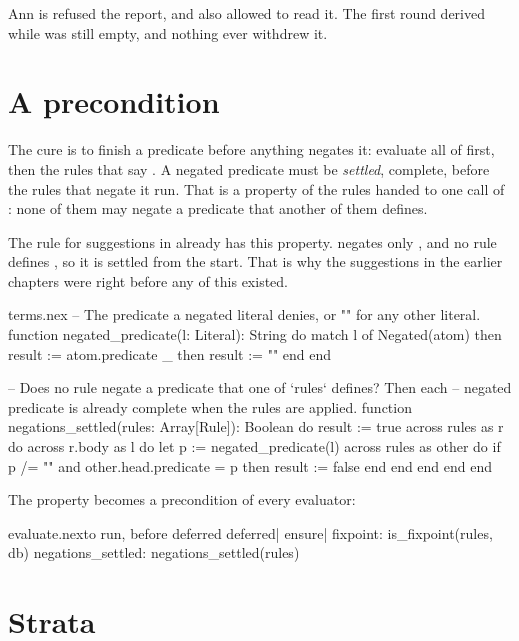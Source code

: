 Ann is refused the report, and also allowed to read it. The first round
derived  while  was still empty,
and nothing ever withdrew it.

\section{A precondition}

The cure is to finish a predicate before anything negates it: evaluate all
of  first, then the rules that say . A
negated predicate must be \emph{settled}, complete, before the rules that
negate it run. That is a property of the rules handed to one call of
: none of them may negate a predicate that another of them
defines.

The rule for suggestions in  already has this property.
 negates only , and no rule defines
, so it is settled from the start. That is why the suggestions
in the earlier chapters were right before any of this existed.

\begin{append}{terms.nex}
-- The predicate a negated literal denies, or "" for any other literal.
function negated_predicate(l: Literal): String
do
  match l of
    Negated(atom) then result := atom.predicate
    _             then result := ""
  end
end

-- Does no rule negate a predicate that one of `rules` defines? Then each
-- negated predicate is already complete when the rules are applied.
function negations_settled(rules: Array[Rule]): Boolean
do
  result := true
  across rules as r do
    across r.body as l do
      let p := negated_predicate(l)
      across rules as other do
        if p /= "" and other.head.predicate = p then
          result := false
        end
      end
    end
  end
end
\end{append}

The property becomes a precondition of every evaluator:

\begin{tightaddbefore}{evaluate.nex}{to run, before deferred}{  deferred|  ensure|    fixpoint: is_fixpoint(rules, db)}
    negations_settled: negations_settled(rules)
\end{tightaddbefore}

\section{Strata}

